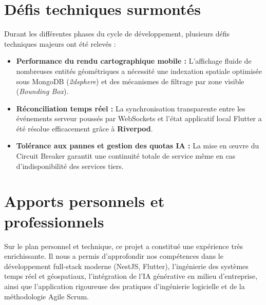 \section*{D\'efis techniques surmont\'es}
Durant les diff\'erentes phases du cycle de d\'eveloppement, plusieurs d\'efis techniques majeurs ont \'et\'e relev\'es :
\begin{itemize}
    \item \textbf{Performance du rendu cartographique mobile :} L'affichage fluide de nombreuses entit\'es g\'eom\'etriques a n\'ecessit\'e une indexation spatiale optimis\'ee sous MongoDB (\textit{2dsphere}) et des m\'ecanismes de filtrage par zone visible (\textit{Bounding Box}).
    \item \textbf{R\'econciliation temps r\'eel :} La synchronisation transparente entre les \'ev\'enements serveur pouss\'es par WebSockets et l'\'etat applicatif local Flutter a \'et\'e r\'esolue efficacement gr\^ace \`a \textbf{Riverpod}.
    \item \textbf{Tol\'erance aux pannes et gestion des quotas IA :} La mise en \oe uvre du Circuit Breaker garantit une continuit\'e totale de service m\^eme en cas d'indisponibilit\'e des services tiers.
\end{itemize}

\section*{Apports personnels et professionnels}
Sur le plan personnel et technique, ce projet a constitu\'e une exp\'erience tr\`es enrichissante. Il nous a permis d'approfondir nos comp\'etences dans le d\'eveloppement full-stack moderne (NestJS, Flutter), l'ing\'enierie des syst\`emes temps r\'eel et g\'eospatiaux, l'int\'egration de l'IA g\'en\'erative en milieu d'entreprise, ainsi que l'application rigoureuse des pratiques d'ing\'enierie logicielle et de la m\'ethodologie Agile Scrum.

